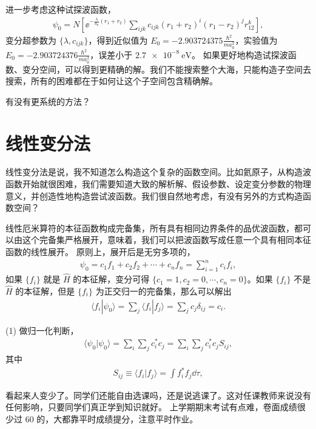 进一步考虑这种试探波函数，
\begin{align}
    \psi_0 = N \left[ 
        \ee^{-\frac{\lambda}{a_0}(r_1 + r_2)}
    \sum_{ijk} c_{ijk} (r_1 + r_2)^i (r_1 - r_2)^j r_{12}^k
    \right],
\end{align}
变分超参数为 $\{\lambda, c_{ijk}\}$，得到近似值为 $E_0 = \num{-2.903724375} \frac{\hbar^2}{ma_0^2}$，实验值为 $E_0 = \num{-2.903724376} \frac{\hbar^2}{ma_0^2}$，误差小于 $\SI{2.7e-8}{\electronvolt}$。
如果更好地构造试探波函数、变分空间，可以得到更精确的解。我们不能搜索整个大海，只能构造子空间去搜索，所有的困难都在于如何让这个子空间包含精确解。

有没有更系统的方法？

\section{线性变分法}
线性变分法是说，我不知道怎么构造这个复杂的函数空间。比如氦原子，从构造波函数开始就很困难，我们需要知道大致的解析解、假设参数、设定变分参数的物理意义，并创造性地构造尝试波函数。我们很自然地考虑，有没有另外的方式构造函数空间？

线性厄米算符的本征函数构成完备集，所有具有相同边界条件的品优波函数，都可以由这个完备集严格展开，意味着，我们可以把波函数写成任意一个具有相同本征函数的线性展开。
原则上，展开后是无穷多项的，
\begin{align}
    \psi_0 = c_1 f_1 + c_2 f_2 + \cdots + c_n f_n = \sum_{i=1}^n c_i f_i,
\end{align}
如果 $\{f_i\}$ 就是 $\hat H$ 的本征解，变分可得 $\{c_1 = 1, c_2=0, \cdots, c_n =0\}$。如果 $\{f_i\}$ 不是 $\hat H$ 的本征解，但是 $\{f_i\}$ 为正交归一的完备集，那么可以解出
\begin{align}
    \langle f_i | \psi_0 \rangle = \sum_j \langle f_i | f_j \rangle = \sum_j c_j \delta_{ij} = c_i.
\end{align}

(1) 做归一化判断，
\begin{align}
    \langle \psi_0 | \psi_0 \rangle = \sum_{i}\sum_j c_i^* c_j = \sum_i \sum_j c_i^* c_j S_{ij}, 
\end{align}
其中
\begin{align}
    S_{ij} \equiv \langle f_i | f_j \rangle = \int f_i^* f_j \dd\tau, 
\end{align}

看起来人变少了。同学们还能自由选课吗，还是说逃课了。这对任课教师来说没有任何影响，只要同学们真正学到知识就好。
上学期期末考试有点难，卷面成绩很少过 60 的，大都靠平时成绩提分，注意平时作业。

